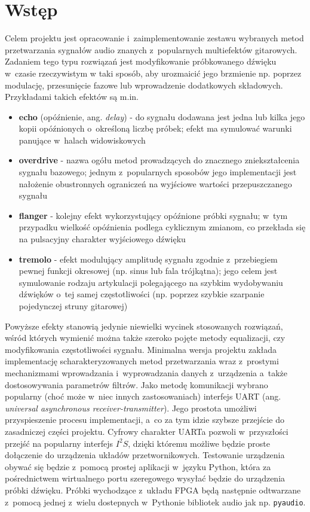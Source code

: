 \section{Wstęp}

Celem projektu jest opracowanie i~zaimplementowanie zestawu wybranych metod przetwarzania sygnałów audio znanych z~popularnych multiefektów gitarowych. Zadaniem tego typu rozwiązań jest modyfikowanie próbkowanego dźwięku w~czasie rzeczywistym w taki sposób, aby urozmaicić jego brzmienie np. poprzez modulację, przesunięcie fazowe lub wprowadzenie dodatkowych składowych. Przykładami takich efektów są m.in.

\begin{itemize}
    \item \textbf{echo} (opóźnienie, ang. \textit{delay}) - do sygnału dodawana jest jedna lub kilka jego kopii opóźnionych o~określoną liczbę próbek; efekt ma symulować warunki panujące w~halach widowiskowych
    \item \textbf{overdrive} - nazwa ogółu metod prowadzących do znacznego zniekształcenia sygnału bazowego; jednym z~popularnych sposobów jego implementacji jest nałożenie obustronnych ograniczeń na wyjściowe wartości przepuszczanego sygnału
    \item \textbf{flanger} - kolejny efekt wykorzystujący opóźnione próbki sygnału; w~tym przypadku wielkość opóźnienia podlega cyklicznym zmianom, co przekłada się na pulsacyjny charakter wyjściowego dźwięku
    \item \textbf{tremolo} - efekt modulujący amplitudę sygnału zgodnie z~przebiegiem pewnej funkcji okresowej (np. sinus lub fala trójkątna); jego celem jest symulowanie rodzaju artykulacji polegającego na szybkim wydobywaniu dźwięków o~tej samej częstotliwości (np. poprzez szybkie szarpanie pojedynczej struny gitarowej) 
\end{itemize}

Powyższe efekty stanowią jedynie niewielki wycinek stosowanych rozwiązań, wśród których wymienić można także szeroko pojęte metody equalizacji, czy modyfikowania częstotliwości sygnału. Minimalna wersja projektu zakłada implementację scharakteryzowanych metod przetwarzania wraz z~prostymi mechanizmami wprowadzania i~wyprowadzania danych z~urządzenia a~także dostosowywania parametrów filtrów. Jako metodę komunikacji wybrano popularny (choć może w~niec innych zastosowaniach) interfejs UART (ang. \textit{universal asynchronous receiver-transmitter}). Jego prostota umożliwi przyspieszenie procesu implementacji, a~co za tym idzie szybsze przejście do zasadniczej części projektu. Cyfrowy charakter UARTa pozwoli w~przyszłości przejść na popularny interfejs $I^{2}S$, dzięki któremu możliwe będzie proste dołączenie do urządzenia układów przetwornikowych. Testowanie urządzenia obywać się będzie z~pomocą prostej aplikacji w~języku Python, która za pośrednictwem wirtualnego portu szeregowego wysyłać będzie do urządzenia próbki dźwięku. Próbki wychodzące z~układu FPGA będą następnie odtwarzane z~pomocą jednej z~wielu dostepnych w~Pythonie bibliotek audio jak np. \verb|pyaudio|.
